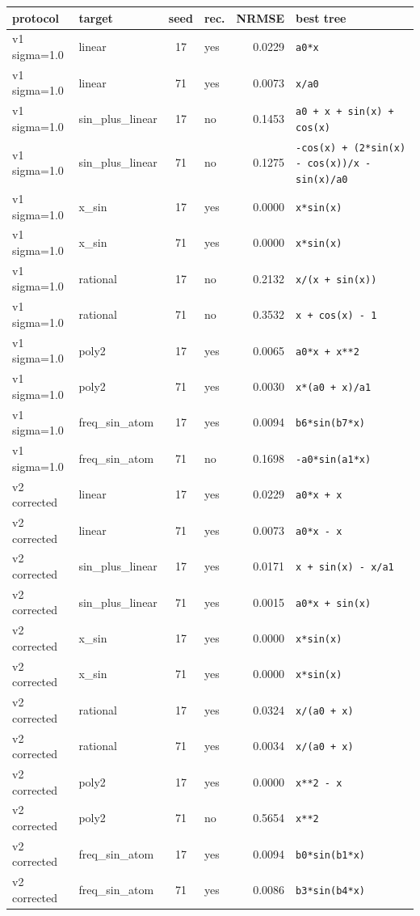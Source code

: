 \begin{tabular}{llclrl}
\hline
protocol & target & seed & rec. & NRMSE & best tree \\
\hline
v1 sigma=1.0 & linear & 17 & yes & 0.0229 & \texttt{a0*x} \\
v1 sigma=1.0 & linear & 71 & yes & 0.0073 & \texttt{x/a0} \\
v1 sigma=1.0 & sin\_plus\_linear & 17 & no & 0.1453 & \texttt{a0 + x + sin(x) + cos(x)} \\
v1 sigma=1.0 & sin\_plus\_linear & 71 & no & 0.1275 & \texttt{-cos(x) + (2*sin(x) - cos(x))/x - sin(x)/a0} \\
v1 sigma=1.0 & x\_sin & 17 & yes & 0.0000 & \texttt{x*sin(x)} \\
v1 sigma=1.0 & x\_sin & 71 & yes & 0.0000 & \texttt{x*sin(x)} \\
v1 sigma=1.0 & rational & 17 & no & 0.2132 & \texttt{x/(x + sin(x))} \\
v1 sigma=1.0 & rational & 71 & no & 0.3532 & \texttt{x + cos(x) - 1} \\
v1 sigma=1.0 & poly2 & 17 & yes & 0.0065 & \texttt{a0*x + x**2} \\
v1 sigma=1.0 & poly2 & 71 & yes & 0.0030 & \texttt{x*(a0 + x)/a1} \\
v1 sigma=1.0 & freq\_sin\_atom & 17 & yes & 0.0094 & \texttt{b6*sin(b7*x)} \\
v1 sigma=1.0 & freq\_sin\_atom & 71 & no & 0.1698 & \texttt{-a0*sin(a1*x)} \\
v2 corrected & linear & 17 & yes & 0.0229 & \texttt{a0*x + x} \\
v2 corrected & linear & 71 & yes & 0.0073 & \texttt{a0*x - x} \\
v2 corrected & sin\_plus\_linear & 17 & yes & 0.0171 & \texttt{x + sin(x) - x/a1} \\
v2 corrected & sin\_plus\_linear & 71 & yes & 0.0015 & \texttt{a0*x + sin(x)} \\
v2 corrected & x\_sin & 17 & yes & 0.0000 & \texttt{x*sin(x)} \\
v2 corrected & x\_sin & 71 & yes & 0.0000 & \texttt{x*sin(x)} \\
v2 corrected & rational & 17 & yes & 0.0324 & \texttt{x/(a0 + x)} \\
v2 corrected & rational & 71 & yes & 0.0034 & \texttt{x/(a0 + x)} \\
v2 corrected & poly2 & 17 & yes & 0.0000 & \texttt{x**2 - x} \\
v2 corrected & poly2 & 71 & no & 0.5654 & \texttt{x**2} \\
v2 corrected & freq\_sin\_atom & 17 & yes & 0.0094 & \texttt{b0*sin(b1*x)} \\
v2 corrected & freq\_sin\_atom & 71 & yes & 0.0086 & \texttt{b3*sin(b4*x)} \\
\hline
\end{tabular}
